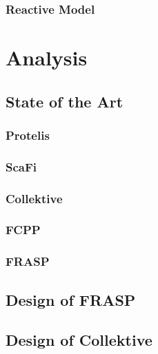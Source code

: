 \documentclass[12pt,a4paper,openright,twoside]{book}
\begin{document}

\subsection{Reactive Model}


\chapter{Analysis}
\label{chap:analysis}
\section{State of the Art}

\subsection{Protelis}

\subsection{ScaFi}

\subsection{Collektive}

\subsection{FCPP}

\subsection{FRASP}

\section{Design of FRASP}


\section{Design of Collektive}
\end{document}
